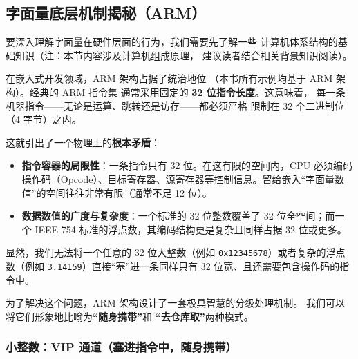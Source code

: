 \subsection{字面量底层机制揭秘（ARM）}

要深入理解字面量在硬件层面的行为，我们需要先了解一些
计算机体系结构的基础知识（注：本节内容涉及计算机组成原理，
建议读者结合相关背景知识阅读）。

在嵌入式开发领域，ARM 架构占据了统治地位
（本书所有示例均基于 ARM 架构）。经典的 ARM 指令集
通常采用固定的 \textbf{32 位指令长度}。这意味着，
每一条机器指令——无论是运算、跳转还是访存——都必须严格
限制在 32 个二进制位（4 字节）之内。

这就引出了一个物理上的\textbf{根本矛盾}：

\begin{itemize}
    \item \textbf{指令容器的局限性}：一条指令只有 32 位。在这有限的空间内，CPU 必须编码操作码（Opcode）、目标寄存器、源寄存器等控制信息。留给嵌入“字面量数值”的空间往往非常有限（通常不足 12 位）。
    \item \textbf{数据数值的广度与复杂度}：一个标准的 32 位整数覆盖了 32 位全空间；而一个 IEEE 754 标准的浮点数，其编码结构更是复杂且同样占据 32 位或更多。
\end{itemize}

显然，我们无法将一个任意的 32 位大整数（例如 \texttt{0x12345678}）或者复杂的浮点数（例如 \texttt{3.14159}）直接“塞”进一条同样只有 32 位宽、且还需要包含操作码的指令中。

为了解决这个问题，ARM 架构设计了一套极具智慧的分级处理机制。
我们可以将它们形象地比喻为\textbf{“随身携带”}和
\textbf{“去仓库取”}两种模式。

\subsubsection{小整数：VIP 通道（塞进指令中，随身携带）}

